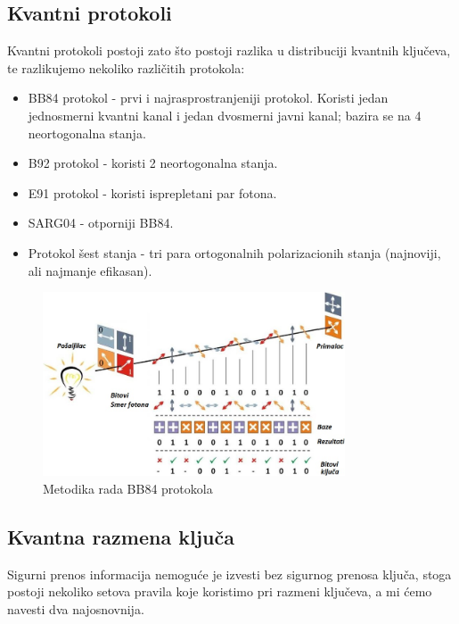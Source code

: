 \documentclass[a4paper]{article}
\begin{document}
{\subsection{Kvantni protokoli}
Kvantni protokoli postoji zato što postoji razlika u distribuciji kvantnih ključeva, te razlikujemo nekoliko različitih protokola:
\begin{itemize}
\item BB84 protokol - prvi i najrasprostranjeniji protokol. Koristi jedan jednosmerni kvantni kanal i jedan dvosmerni javni kanal; bazira se na 4 neortogonalna stanja. 
\item B92 protokol - koristi 2 neortogonalna stanja.
\item E91 protokol - koristi isprepletani par fotona.
\item SARG04 - otporniji BB84.
\item Protokol šest stanja  - tri para ortogonalnih polarizacionih stanja (najnoviji, ali najmanje efikasan).
\end{itemize}
\begin{figure}[h]
\centering
\includegraphics[width=0.8\textwidth]{bb84.jpg}
\caption{Metodika rada BB84 protokola}
\label{slike:prva}
\end{figure}\newpage 
\subsection{Kvantna razmena ključa}
Sigurni prenos informacija nemoguće je izvesti bez sigurnog prenosa ključa, stoga postoji nekoliko setova pravila koje koristimo pri razmeni ključeva, a mi ćemo navesti dva najosnovnija.
\\

}
\end{document}
